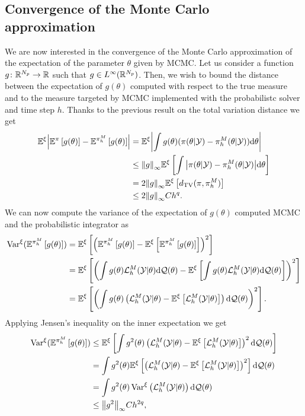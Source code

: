 \subsection{Convergence of the Monte Carlo approximation}\label{sec:ParH}
We are now interested in the convergence of the Monte Carlo approximation of the expectation of the parameter $\theta$ given by MCMC. Let us consider a function $g \colon \mathbb{R}^{N_p} \to \mathbb{R}$ such that $g \in L^\infty(\mathbb{R}^{N_p})$. Then, we wish to bound the distance between the expectation of $g(\theta)$ computed with respect to the true measure and to the measure targeted by MCMC implemented with the probabilistc solver and time step $h$. Thanks to the previous result on the total variation distance we get
\begin{equation}
\begin{aligned}
	\mathbb{E}^\xi\abs{\mathbb{E}^\pi\left[g(\theta)\right] - \mathbb{E}^{\pi_h^M}\left[g(\theta)\right]} &= \mathbb{E}^\xi\abs{\int g(\theta)(\pi(\theta|\mathcal{Y}) - \pi_h^M(\theta|\mathcal{Y}))\dd \theta}\\
	&\leq \norm{g}_\infty \mathbb{E}^\xi \left[\int \abs{\pi(\theta|\mathcal{Y}) - \pi_h^M(\theta|\mathcal{Y})} \dd \theta\right] \\
	&= 2 \norm{g}_\infty \mathbb{E}^\xi\left[d_{\mathrm{TV}}(\pi, \pi_h^M)\right] \\
	&\leq 2 \norm{g}_\infty C h^{q}.
\end{aligned}
\end{equation}
We can now compute the variance of the expectation of $g(\theta)$ computed MCMC and the probabilistic integrator as
\begin{equation}
\begin{aligned}
	\operatorname{Var}^\xi (\mathbb{E}^{\pi_h^M}\left[g(\theta)\right]) &= \mathbb{E}^\xi\left[\left(\mathbb{E}^{\pi^M_h}\left[g(\theta)\right]
													-\mathbb{E}^\xi\left[\mathbb{E}^{\pi^M_h}\left[g(\theta)\right]
													\right]\right)^2\right]\\
		&= \mathbb{E}^\xi\left[\left(\int g(\theta) \mathcal{L}_h^M(\mathcal{Y}|\theta)\dd\mathcal{Q}(\theta) 
		- \mathbb{E}^\xi\left[\int g(\theta) \mathcal{L}_h^M(\mathcal{Y}|\theta)\dd\mathcal{Q}(\theta)\right]
		\right)^2\right]\\
		&=\mathbb{E}^\xi\left[\left(\int g(\theta) \left(\mathcal{L}_h^M(\mathcal{Y}|\theta)-\mathbb{E}^\xi\left[\mathcal{L}_h^M(\mathcal{Y}|\theta)\right]\right)\dd\mathcal{Q}(\theta) 
		\right)^2\right].
\end{aligned}
\end{equation}
Applying Jensen's inequality on the inner expectation we get
\begin{equation}
\begin{aligned}
		\operatorname{Var}^\xi (\mathbb{E}^{\pi_h^M}\left[g(\theta)\right]) &\leq \mathbb{E}^\xi\left[\int g^2(\theta) \left(\mathcal{L}_h^M(\mathcal{Y}|\theta)-\mathbb{E}^\xi\left[\mathcal{L}_h^M(\mathcal{Y}|\theta)\right]\right)^2\dd\mathcal{Q}(\theta) 
		\right]\\
		&= \int g^2(\theta) \mathbb{E}^\xi\left[\left(\mathcal{L}_h^M(\mathcal{Y}|\theta)-\mathbb{E}^\xi\left[\mathcal{L}_h^M(\mathcal{Y}|\theta)\right]\right)^2\right]\dd\mathcal{Q}(\theta) \\
		&= \int g^2(\theta) \operatorname{Var}^\xi\left(\mathcal{L}_h^M(\mathcal{Y}|\theta)\right)\dd\mathcal{Q}(\theta) \\
		&\leq \norm{g^2}_\infty C h^{2q},
\end{aligned}
\end{equation}
